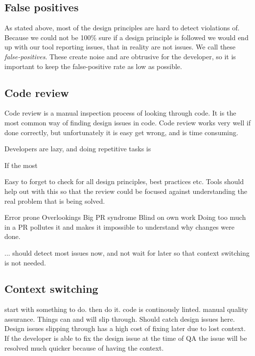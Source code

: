 \documentclass{article}
\begin{document}
\subsection{False positives}
As stated above, most of the design principles are hard to detect violations of. Because we could not be 100\% sure if a design principle is followed we would end up with our tool reporting issues, that in reality are not issues. We call these \textit{false-positives}. These create noise and are obtrusive for the developer, so it is important to keep the false-positive rate as low as possible. 


\subsection{Code review}
\label{code-review}
Code review is a manual inspection process of looking through code. It is the most common way of finding design issues in code. Code review works very well if done correctly, but unfortunately it is easy get wrong, and is time consuming. 


Developers are lazy, and doing repetitive tasks is 



If the most 

Easy to forget to check for all design principles, best practices etc. Tools should help out with this so that the review could be focused against understanding the real problem that is being solved.
 
Error prone
Overlookings
Big PR syndrome
Blind on own work
Doing too much in a PR pollutes it and makes it impossible to understand why changes were done.


... should detect most issues now, and not wait for later so that context switching is not needed.

\subsection{Context switching}
start with something to do.
then do it.
code is continously linted.
manual quality assurance. Things can and will slip through. Should catch design issues here. Design issues slipping through has a high cost of fixing later due to lost context. If the developer is able to fix the design issue at the time of QA the issue will be resolved much quicker because of having the context.
\end{document}

